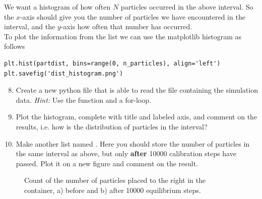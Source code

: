 \documentclass{article}
\begin{document}
We want a histogram of how often $N$ particles occurred in the above interval.
So the $x$-axis should give you the number of particles we have encountered in the interval, and the $y$-axis how often that number has occurred.\\

To plot the information from the list we can use the matplotlib histogram as follows

\begin{lstlisting}
plt.hist(partdist, bins=range(0, n_particles), align='left')
plt.savefig('dist_histogram.png')
\end{lstlisting}


\begin{enumerate}
  \setcounter{enumi}{7}

  \item Create a new python file that is able to read the file containing the simulation data.
      {\em Hint:} Use the  function and a for-loop.

  \item Plot the histogram, complete with title and labeled axis, and comment on the results, i.e. how is the     distribution of particles in the interval?

  \item Make another list named . Here you should store the number of particles in the same interval as above, but only {\bf after} 10000 calibration steps have passed.
    Plot it on a new figure and comment on the result.

\end{enumerate}

\begin{figure}[htb]
  \label{fig:partdist}
  \caption{
     Count of the number of particles placed to the right in the container, a) before and b) after 10000 equilibrium steps.
  }
\end{figure}



\end{document}
